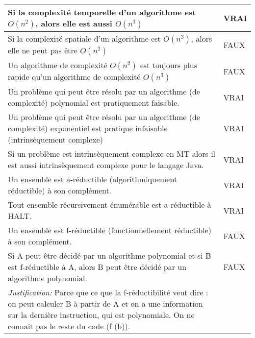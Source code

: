 \begin{tabular}{p{13cm}|l}
    Si la complexité temporelle d'un algorithme est $O(n^{2})$, alors elle est aussi $O(n^{3})$ & VRAI \\
    \hline
    Si la complexité spatiale d'un algorithme est $O(n^{3})$, alors elle ne peut pas être $O(n^{2})$  & FAUX \\
    \hline
    Un algorithme de complexité $O(n^{2})$ est toujours plus rapide qu'un algorithme de complexité $O(n^{3})$ & FAUX \\
    \hline
    Un problème qui peut être résolu par un algorithme (de complexité) polynomial est pratiquement faisable. & VRAI \\
    \hline
    Un problème qui peut être résolu par un algorithme (de complexité) exponentiel est pratique infaisable (intrinsèquement complexe) & VRAI \\
    \hline
    Si un problème est intrinsèquement complexe en MT alors il est aussi intrinsèquement complexe pour le langage Java.& VRAI\\
    \hline
    Un ensemble est a-réductible (algorithmiquement réductible) à son complément.& VRAI\\
    \hline
    Tout ensemble récursivement énumérable est a-réductible à HALT. & VRAI\\
    \hline
    Un ensemble est f-réductible (fonctionnellement réductible) à son complément. & FAUX \\
    \hline
    Si A peut être décidé par un algorithme polynomial et si B est f-réductible à A, alors B peut être décidé par un algorithme polynomial. & FAUX \\
    \textit{Justification:} Parce que ce que la f-réductibilité veut dire : on peut calculer B à partir de A et on a une information sur la dernière instruction, qui est polynomiale. On ne connait pas le reste du code (f (b)). &\\
\end{tabular}